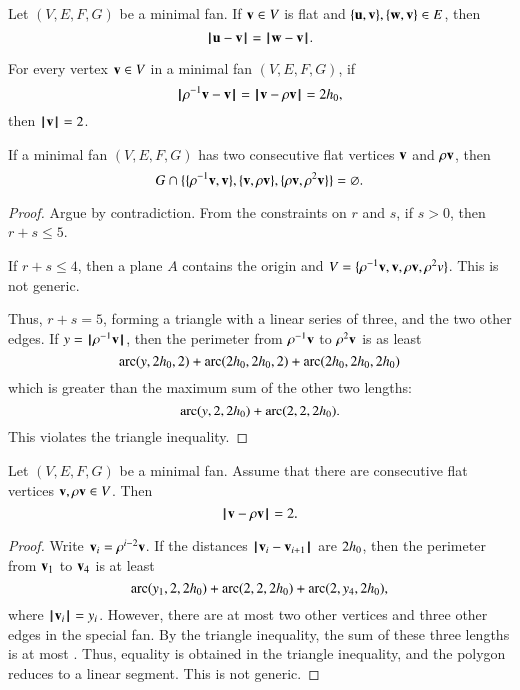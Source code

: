 \begin{lemma}
Let $(V,E,F,G)$ be a minimal fan.
If $\v\in V$ is flat and $\{\u,\v\},\{\w,\v\}\in E$, then
$$
\norm{\u}{\v} = \norm{\w}{\v}.
$$
\end{lemma}

\begin{lemma}
For every vertex $\v\in V$ in a minimal fan $(V,E,F,G)$,
if 
$$\norm{\rho^{-1} \v}{\v}=\norm{\v}{\rho \v} = 2\hm,$$
then $\normo{\v}=2$.
\end{lemma}




\begin{lemma}
If a minimal fan $(V,E,F,G)$ 
has two consecutive flat vertices $\v$ and $\rho \v$, then 
$$G\cap \{\{\rho^{-1}\v,\v\},\{\v,\rho \v\},\{\rho \v,\rho^2 \v\}\} = \emptyset.$$
\end{lemma}

\begin{proof}  Argue by contradiction.  From the constraints on $r$ and $s$, if $s>0$, then $r+s\le 5$. 

If $r+s\le 4$, then a plane $A$ contains the origin and $V = \{\rho^{-1}\v,\v,\rho \v,\rho^2v\}$.  This is not generic.

Thus, $r+s=5$, forming a triangle with a linear series of three, and the two other edges.  If $y=\normo{\rho^{-1} \v}$, then the perimeter from $\rho^{-1}\v$ to $\rho^2 \v$ is as least
$$
\arc(y,2\hm,2)+\arc(2\hm,2\hm,2) +\arc(2\hm,2\hm,2\hm)
$$
which is greater than the maximum sum of the other two lengths:
$$
\arc(y,2,2\hm)+\arc(2,2,2\hm).
$$
This violates the triangle inequality.
\end{proof}



\begin{lemma}  Let $(V,E,F,G)$ be a minimal fan. Assume that there are consecutive flat vertices $\v,\rho \v\in V$. 
Then 
$$
\norm{\v}{\rho \v} = 2.
$$
\end{lemma}

\begin{proof} Write $\v_i = \rho^{i-2} \v$.  If the distances $\norm{\v_i}{\v_{i+1}}$ are $2\hm$, then the perimeter from $\v_1$ to $\v_4$ is at least
\begin{equation}\label{eqn:3side}
\arc(y_1,2,2\hm)+\arc(2,2,2\hm)+\arc(2,y_4,2\hm),
\end{equation}
where $\normo{\v_i}=y_i$.
However, there are at most two other vertices and three other edges in the special fan.  By the triangle inequality, the sum of these three lengths is at most .
Thus, equality is obtained in the triangle inequality, and the polygon reduces to a linear segment.  This is not generic.
\end{proof}

